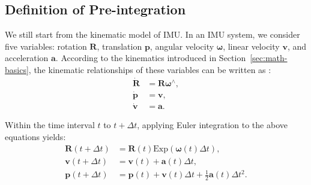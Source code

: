 \subsection{Definition of Pre-integration}
We still start from the kinematic model of IMU. In an IMU system, we consider five variables: rotation $\bm{R}$, translation $\bm{p}$, angular velocity $\boldsymbol{\omega}$, linear velocity $\bm{v}$, and acceleration $\bm{a}$. According to the kinematics introduced in Section~\ref{sec:math-basics}, the kinematic relationships of these variables can be written as \cite{Murray2017}:
\begin{subequations}\label{key}
	\begin{align}
		\dot{\bm{R}} &= \bm{R} \boldsymbol{\omega}^\wedge, \\
		\dot{\bm{p}} &= \bm{v}, \\
		\dot{\bm{v}} &= \bm{a}.
	\end{align}
\end{subequations}

Within the time interval $t$ to $t+\Delta t$, applying Euler integration to the above equations yields:
\begin{subequations}\label{key}
	\begin{align}
		\bm{R}(t+\Delta t) &= \bm{R}(t) \mathrm{Exp} (\boldsymbol{\omega}(t) \Delta t), \\
		\bm{v}(t+\Delta t) &= \bm{v}(t) + \bm{a}(t) \Delta t, \\
		\bm{p}(t+\Delta t) &= \bm{p}(t) + \bm{v}(t) \Delta t + \frac{1}{2} \bm{a}(t) \Delta t^2.
	\end{align}
\end{subequations}

